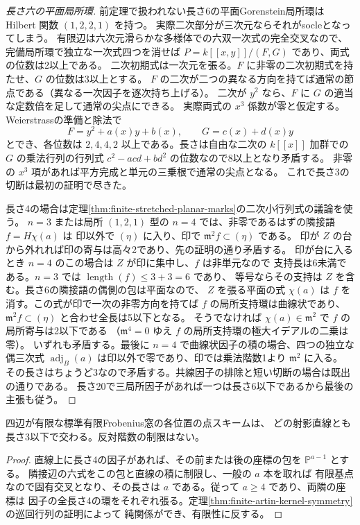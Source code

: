 \begin{proof}[長さ六の平面局所環]
前定理で扱われない長さ6の平面Gorenstein局所環は Hilbert 関数 $(1,2,2,1)$ を持つ。
実際二次部分が三次元ならそれがsocleとなってしまう。
有限辺は六次元滑らかな多様体での六双一次式の完全交叉なので、
完備局所環で独立な一次式四つを消せば $P=k[[x,y]]/(F,G)$ であり、両式の位数は2以上である。
二次初期式は一次元を張る。$F$ に非零の二次初期式を持たせ、$G$ の位数は3以上とする。
$F$ の二次が二つの異なる方向を持てば通常の節点である（異なる一次因子を逐次持ち上げる）。
二次が $y^2$ なら、$F$ に $G$ の適当な定数倍を足して通常の尖点にできる。
実際両式の $x^3$ 係数が零と仮定する。Weierstrassの準備と除法で
\[
                F=y^2+a(x)y+b(x),\qquad G=c(x)+d(x)y
\]
とでき、各位数は $2,4,4,2$ 以上である。長さは自由な二次の $k[[x]]$ 加群での
$G$ の乗法行列の行列式 $c^2-acd+bd^2$ の位数なので8以上となり矛盾する。
非零の $x^3$ 項があれば平方完成と単元の三乗根で通常の尖点となる。
これで長さ3の切断は最初の証明で尽きた。

長さ4の場合は定理\ref{thm:finite-stretched-planar-marks}の二次小行列式の議論を使う。
$n=3$ または局所 $(1,2,1)$ 型の $n=4$ では、非零であるはずの隣接語 $f=H\chi(a)$ は
印以外で $(\eta)$ に入り、印で $\mathfrak m^2 f\subset(\eta)$ である。
印が $Z$ の台から外れれば印の寄与は高々2であり、先の証明の通り矛盾する。
印が台に入るとき $n=4$ のこの場合は $Z$ が印に集中し、$f$ は非単元なので
支持長は6未満である。$n=3$ では $\operatorname{length}(f)\le3+3=6$ であり、
等号ならその支持は $Z$ を含む。長さ6の隣接語の偶側の包は平面なので、
$Z$ を張る平面の式 $\chi(a)$ は $f$ を消す。この式が印で一次の非零方向を持てば
$f$ の局所支持環は曲線状であり、$\mathfrak m^2 f\subset(\eta)$ と合わせ全長は5以下となる。
そうでなければ $\chi(a)\in\mathfrak m^2$ で $f$ の局所寄与は2以下である
（$\mathfrak m^4=0$ ゆえ $f$ の局所支持環の極大イデアルの二乗は零）。
いずれも矛盾する。最後に $n=4$ で曲線状因子の積の場合、四つの独立な偶三次式
$\operatorname{adj}_B(a)$ は印以外で零であり、印では乗法階数1より $\mathfrak m^2$ に入る。
その長さはちょうど3なので矛盾する。共線因子の排除と短い切断の場合は既出の通りである。
長さ20で三局所因子があれば一つは長さ6以下であるから最後の主張も従う。
\end{proof}

\begin{corollary}\label{cor:finite-no-four-on-line}
四辺が有限な標準有限Frobenius窓の各位置の点スキームは、
どの射影直線とも長さ3以下で交わる。反対階数の制限はない。
\end{corollary}
\begin{proof}
直線上に長さ4の因子があれば、その前または後の座標の包を $\mathbb P^{a-1}$ とする。
隣接辺の六式をこの包と直線の積に制限し、一般の $a$ 本を取れば
有限基点なので固有交叉となり、その長さは $a$ である。従って $a\ge4$ であり、両隣の座標は
因子の全長さ4の環をそれぞれ張る。定理\ref{thm:finite-artin-kernel-symmetry}の巡回行列の証明によって
純関係ができ、有限性に反する。
\end{proof}
